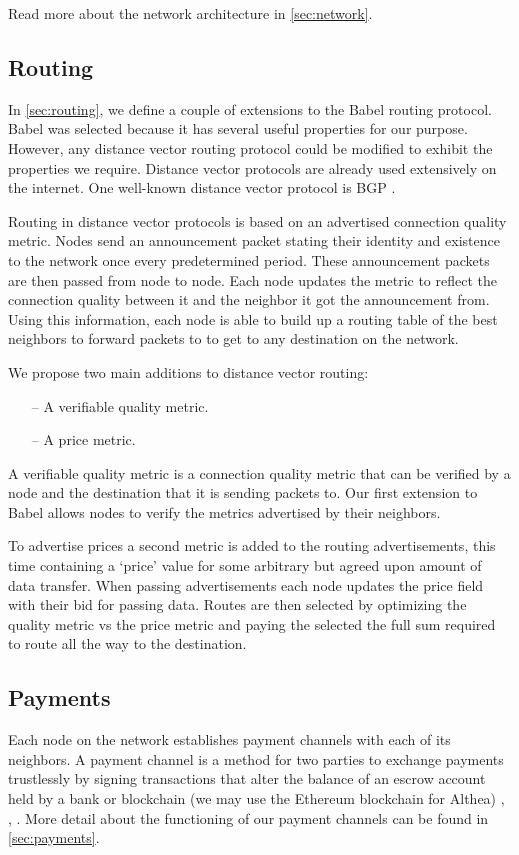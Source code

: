 \documentclass[11pt]{article}
\begin{document}
Read more about the network architecture in \autoref{sec:network}.

\subsection{Routing}
In \autoref{sec:routing}, we define a couple of extensions to the Babel routing protocol. Babel was selected because it has several useful properties for our purpose. However, any distance vector routing protocol could be modified to exhibit the properties we require. Distance vector protocols are already used extensively on the internet. One well-known distance vector protocol is BGP \cite{bgp}.
 
Routing in distance vector protocols is based on an advertised connection quality metric. Nodes send an announcement packet stating their identity and existence to the network once every predetermined period. These announcement packets are then passed from node to node. Each node updates the metric to reflect the connection quality between it and the neighbor it got the announcement from. Using this information, each node is able to build up a routing table of the best neighbors to forward packets to to get to any destination on the network.
 
We propose two main additions to distance vector routing:

\begin{itemize}
\item[--] A verifiable quality metric.
\item[--] A price metric.
\end{itemize}

A verifiable quality metric is a connection quality metric that can be verified by a node and the destination that it is sending packets to. Our first extension to Babel allows nodes to verify the metrics advertised by their neighbors.
 
To advertise prices a second metric is added to the routing advertisements, this time containing a ‘price’ value for some arbitrary but agreed upon amount of data transfer. When passing advertisements each node updates the price field with their bid for passing data. Routes are then selected by optimizing the quality metric vs the price metric and paying the selected the full sum required to route all the way to the destination. 

\subsection{Payments}
Each node on the network establishes payment channels with each of its neighbors. A payment channel is a method for two parties to exchange payments trustlessly by signing transactions that alter the balance of an escrow account held by a bank or blockchain (we may use the Ethereum blockchain for Althea) \cite{btcwiki}, \cite{bitcoinj}, \cite{machinomy}. More detail about the functioning of our payment channels can be found in \autoref{sec:payments}.
 
\end{document}
